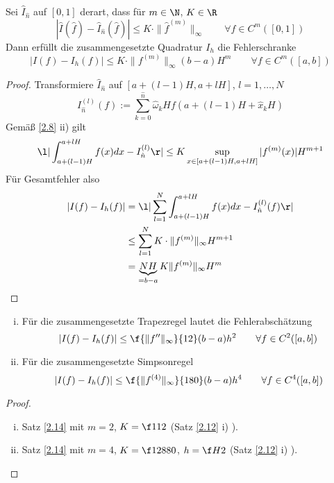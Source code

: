 \documentclass[11pt]{scrbook}
\begin{document}
\begin{st}
	\label{2.14}
	Sei $\hat I_{\hat n}$ auf $[0,1]$ derart, dass für $m\in \N$, $K\in \R$
	\[
		|\hat I(\hat f) - \hat I_{\hat n}(\hat f)| \le K \cdot \|\hat f^{(m)}\|_\infty
		\qquad \forall \hat f \in C^m([0,1])		
	\]
	Dann erfüllt die zusammengesetzte Quadratur $I_h$ die Fehlerschranke
	\[
		|I(f) - I_{h}(f)| \le K \cdot \| f^{(m)}\|_\infty (b-a) H^m
		\qquad \forall f \in C^m([a,b])	
	\]
	\begin{proof}
		Transformiere $\hat I_{\hat n}$ auf $[a+(l-1)H, a+lH]$, $l=1,\dotsc,N$
		\[
			I_{\hat n}^{(l)}(f) := \sum_{k=0}^{\hat n} \hat \omega_k H f(a+(l-1)H + \hat x_k H)
		\]
		Gemäß \ref{2.8} ii) gilt
		\[
			\l| \int_{a+(l-1)H}^{a+lH} f(x) dx - I_{\hat n}^{(l)}\r| \le K \sup_{x\in [a+(l-1)H,a+lH]} |f^{(m)}(x)| H^{m+1}
		\]
		Für Gesamtfehler also
		\begin{align*}
			|I(f) - I_h(f)| 
			&= \l| \sum_{l=1}^N \int_{a+(l-1)H}^{a+lH} f(x) dx - I_{\hat n}^{(l)}(f)\r| \\
			&\le \sum_{l=1}^N K \cdot \|f^{(m)}\|_\infty H^{m+1} \\
			&= \underbrace{N H}_{=b-a} K \|f^{(m)}\|_\infty H^m
		\end{align*}
	\end{proof}
\end{st}

\begin{kor}
	\label{2.15}
	\begin{enumerate}[i)]
		\item
			Für die zusammengesetzte Trapezregel lautet die Fehlerabschätzung
			\[
				|I(f) - I_h(f)| \le \f {\|f''\|_{\infty}}{12} (b-a) h^2 \qquad \forall f \in C^2 ([a,b])
			\]
		\item
			Für die zusammengesetzte Simpsonregel
			\[
				|I(f) - I_h(f)| \le \f {\|f^{(4)}\|_\infty}{180} (b-a) h^4 \qquad \forall f \in  C^4([a,b])
			\]
	\end{enumerate}
	\begin{proof}
		\begin{enumerate}[i)]
			\item
				Satz \ref{2.14} mit $m=2$, $K=\f 1{12}$ (Satz \ref{2.12} i) ).
			\item
				Satz \ref{2.14} mit $m=4$, $K=\f 1{2880}$, $h=\f H2$ (Satz \ref{2.12} i) ).
		\end{enumerate}
	\end{proof}
\end{kor}
\end{document}
